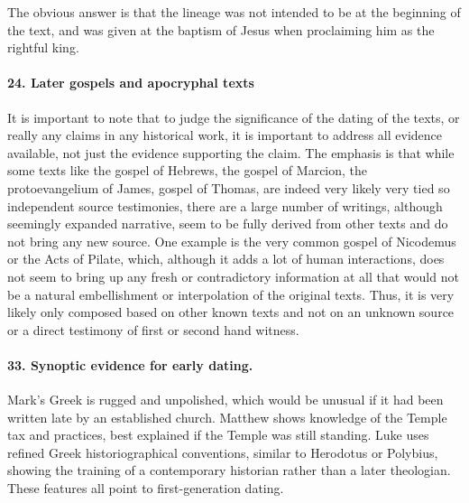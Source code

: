 The obvious answer is that the lineage was not intended to be at the beginning of the text, and was given at the baptism of Jesus when proclaiming him as the rightful king.

\paragraph{24.
Later gospels and apocryphal texts}\label{par:later-gospels-and-apocryphal-texts}

It is important to note that to judge the significance of the dating of the texts, or really any claims in any historical work, it is important to address all evidence available, not just the evidence supporting the claim.
The emphasis is that while some texts like the gospel of Hebrews, the gospel of Marcion, the protoevangelium of James, gospel of Thomas, are indeed very likely very tied so independent source testimonies, there are a large number of writings, although seemingly expanded narrative, seem to be fully derived from other texts and do not bring any new source.
One example is the very common gospel of Nicodemus or the Acts of Pilate, which, although it adds a lot of human interactions, does not seem to bring up any fresh or contradictory information at all that would not be a natural embellishment or interpolation of the original texts.
Thus, it is very likely only composed based on other known texts and not on an unknown source or a direct testimony of first or second hand witness.

\paragraph{33.
Synoptic evidence for early dating.}\label{par:synoptic-evidence-for-early-dating.}

Mark’s Greek is rugged and unpolished, which would be unusual if it had been written late by an established church.
Matthew shows knowledge of the Temple tax and practices, best explained if the Temple was still standing.
Luke uses refined Greek historiographical conventions, similar to Herodotus or Polybius, showing the training of a contemporary historian rather than a later theologian.
These features all point to first-generation dating.
